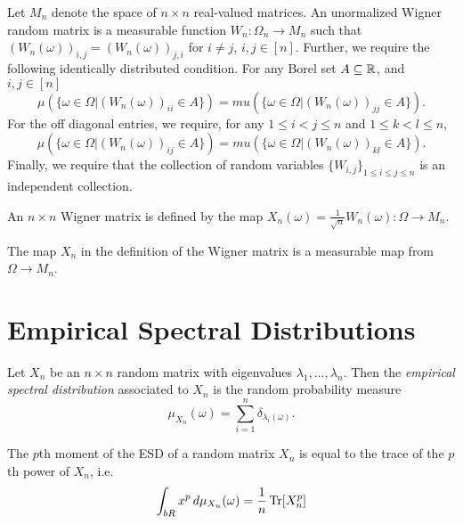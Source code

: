\begin{definition}
  \label{def:symmetricNbyNIndependentEntriesRandomMatrixUnnormalized}
  \notready
  Let $M_n$ denote the space of $n \times n$ real-valued matrices. An unormalized Wigner random matrix is a measurable function $W_n :\Omega_n \to M_n$ such that $(W_n(\omega))_{i, j} = (W_n(\omega))_{j, i}$ for $i \neq j$, $i, j \in [n]$.
  Further, we require the following identically distributed condition. For any Borel set $A \subseteq \mathbb{R}$, and $i, j \in [n]$
  \[
  \mu(\{\omega \in \Omega \vert (W_n(\omega))_{ii} \in A\}) = mu(\{\omega \in \Omega \vert (W_n(\omega))_{jj} \in A\}).
  \]
  For the off diagonal entries, we require, for any $1 \leq i < j \leq n$ and $1 \leq k < l \leq n$,
  \[
  \mu(\{\omega \in \Omega \vert (W_n(\omega))_{ij} \in A\}) = mu(\{\omega \in \Omega \vert (W_n(\omega))_{kl} \in A\}).
  \]
  Finally, we require that the collection of random variables $\{W_{i, j}\}_{1 \leq i \leq j \leq n}$ is an independent collection.
\end{definition}

\begin{definition}
  \label{def:symmetricNbyNIndependentEntriesRandomMatrix}
  \notready
  An $n \times n$ Wigner matrix is defined by the map $X_n(\omega) = \frac{1}{\sqrt{n}}W_n(\omega) :\Omega \to M_n$.
\end{definition}

\begin{lemma}
  \label{lem:symmetricNbyNIndependentEntriesRandomMatrix_map_measurable}
  \notready
  The map $X_n$ in the definition of the Wigner matrix is a measurable map from $\Omega \to M_n$.
\end{lemma}

\section{Empirical Spectral Distributions}


\begin{definition}
  \label{def:empiricalSpectralDistribution}
  \notready
  Let $X_n$ be an $n \times n$ random matrix with eigenvalues $\lambda_1, \dots, \lambda_n$. Then the \textit{empirical spectral distribution} associated to $X_n$ is the random probability measure
  \[
  \mu_{X_n}(\omega) = \sum_{i=1}^n \delta_{\lambda_i(\omega)}.
  \]
\end{definition}

\begin{lemma}
  \label{lem:pth_moment_ESD_trace_pth_power}
  \notready
  The $p$th moment of the ESD of a random matrix $X_n$ is equal to the trace of the $p$th power of $X_n$, i.e.
  \[
  \int_{bR} x^p \, d\mu_{X_n}(\omega) = \frac{1}{n}\operatorname{Tr}[X_n^p]
  \]
\end{lemma}
